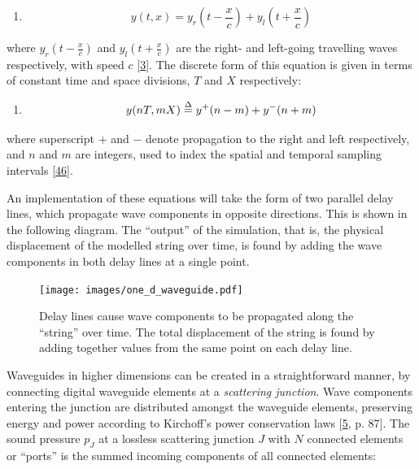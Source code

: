 \documentclass[]{scrreprt}
\providecommand{\tightlist}{%
  \setlength{\itemsep}{0pt}\setlength{\parskip}{0pt}}
\begin{document}
\begin{enumerate}
\def\labelenumi{(\arabic{enumi})}
\setcounter{enumi}{16}
\tightlist
\item
  \[y(t,x)=y_r\left(t-\frac{x}{c}\right) + y_l\left(t+\frac{x}{c}\right)\]
\end{enumerate}

where \(y_r\left(t-\frac{x}{c}\right)\) and
\(y_l\left(t+\frac{x}{c}\right)\) are the right- and left-going
travelling waves respectively, with speed \(c\)
{[}\protect\hyperlink{ref-smithux5fphysicalux5f1992}{3}{]}. The discrete
form of this equation is given in terms of constant time and space
divisions, \(T\) and \(X\) respectively:

\begin{enumerate}
\def\labelenumi{(\arabic{enumi})}
\setcounter{enumi}{17}
\tightlist
\item
  \[y(nT,mX) \buildrel \Delta \over = y^+(n-m) + y^-(n+m)\]
\end{enumerate}

where superscript \(+\) and \(-\) denote propagation to the right and
left respectively, and \(n\) and \(m\) are integers, used to index the
spatial and temporal sampling intervals
{[}\protect\hyperlink{ref-smithux5fiiiux5fequivalenceux5f2004}{46}{]}.

An implementation of these equations will take the form of two parallel
delay lines, which propagate wave components in opposite directions.
This is shown in the following
diagram\text{ (\ref{fig:one_d_waveguide})}. The ``output'' of the
simulation, that is, the physical displacement of the modelled string
over time, is found by adding the wave components in both delay lines at
a single point.

\begin{figure}[htbp]
\centering
\texttt{[image: images/one\_d\_waveguide.pdf]}
\caption{Delay lines cause wave components to be propagated along the
``string'' over time. The total displacement of the string is found by
adding together values from the same point on each delay
line.\label{fig:one_d_waveguide}}
\end{figure}

Waveguides in higher dimensions can be created in a straightforward
manner, by connecting digital waveguide elements at a \emph{scattering
junction}. Wave components entering the junction are distributed amongst
the waveguide elements, preserving energy and power according to
Kirchoff's power conservation laws
{[}\protect\hyperlink{ref-shelleyux5fdiffuseux5f2007}{5}, p. 87{]}. The
sound pressure \(p_J\) at a lossless scattering junction \(J\) with
\(N\) connected elements or ``ports'' is the summed incoming components
of all connected elements:
\end{document}
